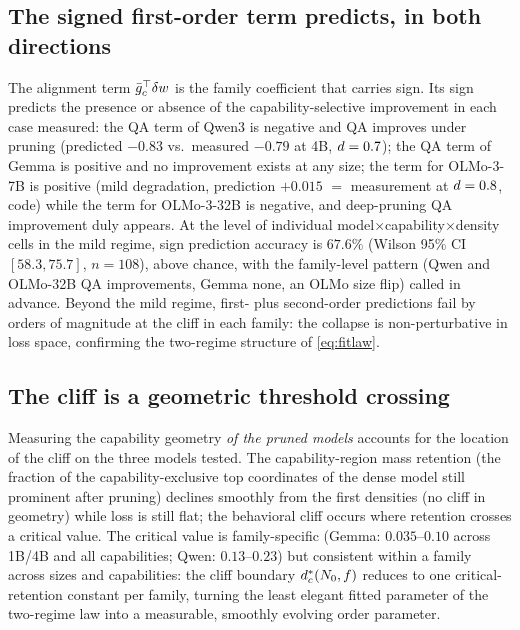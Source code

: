 \subsection{The signed first-order term predicts, in both directions}
\label{sec:mech}

The alignment term $\bar{g}_{c}^{\top}\delta w$ is the family
coefficient that carries sign. Its sign predicts the presence or absence of the
capability-selective improvement in each case measured:
the QA term of Qwen3 is negative and QA improves under pruning (predicted
$-0.83$ vs.\ measured $-0.79$ at 4B, $d=0.7$); the QA term of Gemma is
positive and no improvement exists at any size; the term for OLMo-3-7B is
positive (mild degradation, prediction $+0.015$ $=$ measurement at
$d=0.8$, code) while the term for OLMo-3-32B is negative, and
deep-pruning QA improvement duly appears. At the level of individual model$\times$capability$\times$density
cells in the mild regime, sign prediction accuracy is $67.6\%$
(Wilson 95\% CI $[58.3,75.7]$, $n{=}108$), above chance, with the
family-level pattern (Qwen and OLMo-32B QA improvements, Gemma
none, an OLMo size flip) called in advance. Beyond the mild regime, first- plus second-order
predictions fail by orders of magnitude at the cliff in each family:
the collapse is non-perturbative in loss space, confirming the
two-regime structure of \eqref{eq:fitlaw}.

\subsection{The cliff is a geometric threshold crossing}
\label{sec:orderparam}

Measuring the capability geometry \emph{of the pruned models}
accounts for the location of the cliff on the three models tested. The
capability-region mass retention (the fraction of the
capability-exclusive top coordinates of the dense model still
prominent after pruning) declines smoothly from the first densities
(no cliff in geometry) while loss is still flat;
the behavioral cliff occurs where retention crosses a critical value.
The critical value is family-specific (Gemma: $0.035$--$0.10$ across
1B/4B and all capabilities; Qwen: $0.13$--$0.23$) but consistent
within a family across sizes and capabilities: the cliff boundary
$d_c^{*}(N_0,f)$ reduces to one critical-retention constant per
family, turning the least elegant fitted parameter of the two-regime
law into a measurable, smoothly evolving order parameter.

